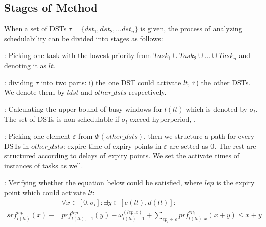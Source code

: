 \documentclass[sigconf]{acmart}
\begin{document}
\subsection{Stages of Method}\label{section_8steps}
When a set of DSTs $\tau=\{dst_1,dst_2, \dots dst_n\}$ is given, the process of analyzing schedulability can be divided into stages as follows:
\begin{compactenum}

  \item: Picking one task with the lowest priority from $Task_1\cup Task_2\cup\dots\cup Task_n$ and denoting it as $lt$. %
  \item: dividing $\tau$ into two parts: i) the one DST could activate $lt$, ii) the other DSTs. We denote them by $ldst$ and $other\_dsts$ respectively. %

  \item: Calculating the upper bound of busy windows for $l(lt)$ which is denoted by $\sigma_l$. The set of DSTs is non-schedulable if $\sigma_l$ exceed hyperperiod, .%
  
  \item: Picking one element $\varepsilon$ from $\Phi(other\_dsts)$, then we structure a path for every DSTs in $other\_dsts$: expire time of expiry points in $\varepsilon$ are setted as 0. The rest are structured according to delays of expiry points. We set the activate times of instances of tasks as well.%

  \item: Verifying whether the equation below could be satisfied, where $lep$ is the expiry point which could activate $lt$:%
  \begin{equation}\begin{split}
      &\forall x\in[0,\sigma_l]:\exists y\in[e(lt),d(lt)]:\\
      srf^{lep}_{l(lt)}(x)+&prf^{lep}_{l(lt),-1}(y)-\omega^{(lep,x)}_{l(lt),-1}+\sum\limits_{ep_i\in\varepsilon}prf^{ep_i}_{l(lt),x}(x+y)\leq x+y
    \end{split}\label{equation_verify}\end{equation}
  

\end{compactenum}
\end{document}
